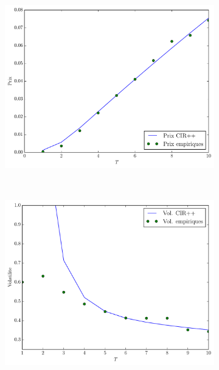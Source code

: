 \begin{figure}
  \centering
  \begin{subfigure}{0.3\paperwidth}
    \centering
    \includegraphics[width=0.3\paperwidth]{../fig/cap_price.pdf}
  \end{subfigure}
  ~
  \begin{subfigure}{0.3\paperwidth}
    \centering
    \includegraphics[width=0.3\paperwidth]{../fig/cap_vol.pdf}
  \end{subfigure}
  \caption{}
  \label{capvol}
\end{figure}



